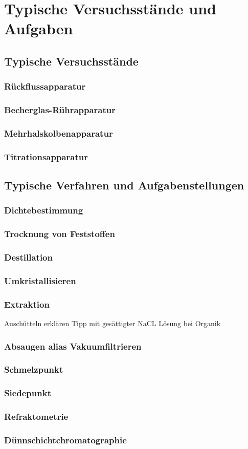 \section{Typische Versuchsstände und Aufgaben}

\subsection{Typische Versuchsstände}
\subsubsection*{Rückflussapparatur}
\subsubsection*{Becherglas-Rührapparatur}
\subsubsection*{Mehrhalskolbenapparatur}
\subsubsection{Titrationsapparatur}

\subsection{Typische Verfahren und Aufgabenstellungen}
\subsubsection{Dichtebestimmung}
\subsubsection{Trocknung von Feststoffen}
\subsubsection{Destillation}
\subsubsection{Umkristallisieren}
\subsubsection{Extraktion}
\label{sec:extraktion}
Auschütteln erklären
Tipp mit gesättigter NaCL Lösung bei Organik
\subsubsection{Absaugen alias Vakuumfiltrieren}
\subsubsection{Schmelzpunkt}
\subsubsection{Siedepunkt}
\subsubsection{Refraktometrie}
\subsubsection{Dünnschichtchromatographie}
